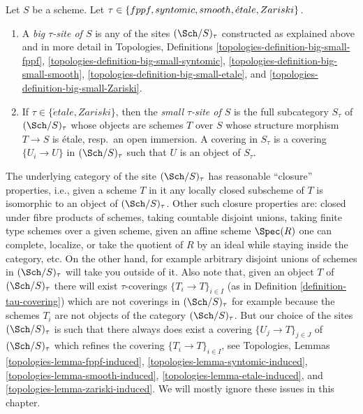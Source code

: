 \begin{definition}
\label{definition-tau-site}
Let $S$ be a scheme.
Let $\tau \in \{fppf, syntomic, smooth, \acute{e}tale, \linebreak[0] Zariski\}$.
\begin{enumerate}
\item A {\it big $\tau$-site of $S$} is any of the sites
$(\Sch/S)_\tau$ constructed as explained above and in more detail in
Topologies, Definitions
\ref{topologies-definition-big-small-fppf},
\ref{topologies-definition-big-small-syntomic},
\ref{topologies-definition-big-small-smooth},
\ref{topologies-definition-big-small-etale}, and
\ref{topologies-definition-big-small-Zariski}.
\item If $\tau \in \{\acute{e}tale, Zariski\}$, then the
{\it small $\tau$-site of $S$}
is the full subcategory $S_\tau$ of $(\Sch/S)_\tau$ whose objects
are schemes $T$ over $S$ whose structure morphism $T \to S$ is \'etale,
resp.\ an open immersion. A covering in $S_\tau$ is a covering
$\{U_i \to U\}$ in $(\Sch/S)_\tau$
such that $U$ is an object of $S_\tau$.
\end{enumerate}
\end{definition}

\noindent
The underlying category of the site $(\Sch/S)_\tau$ has reasonable
``closure'' properties, i.e., given a scheme $T$ in it any locally closed
subscheme of $T$ is isomorphic to an object of $(\Sch/S)_\tau$.
Other such closure properties are: closed under fibre products of schemes,
taking countable disjoint unions,
taking finite type schemes over a given scheme, given an affine scheme
$\Spec(R)$ one can complete, localize, or take the quotient of $R$
by an ideal while staying inside the category, etc.
On the other hand, for example arbitrary disjoint unions
of schemes in $(\Sch/S)_\tau$ will take you outside of it.
Also note that, given an object $T$ of $(\Sch/S)_\tau$ there will exist
$\tau$-coverings $\{T_i \to T\}_{i \in I}$ (as in
Definition \ref{definition-tau-covering})
which are not coverings in $(\Sch/S)_\tau$ for example
because the schemes $T_i$ are not objects of the category
$(\Sch/S)_\tau$. But our choice of the sites $(\Sch/S)_\tau$
is such that there always does exist
a covering $\{U_j \to T\}_{j \in J}$ of $(\Sch/S)_\tau$ which refines
the covering $\{T_i \to T\}_{i \in I}$, see
Topologies, Lemmas
\ref{topologies-lemma-fppf-induced},
\ref{topologies-lemma-syntomic-induced},
\ref{topologies-lemma-smooth-induced},
\ref{topologies-lemma-etale-induced}, and
\ref{topologies-lemma-zariski-induced}.
We will mostly ignore these issues in this chapter.

